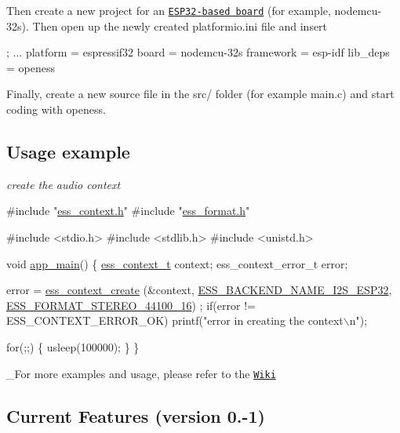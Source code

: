Then create a new project for an \href{http://docs.platformio.org/en/latest/platforms/espressif32.html#boards}{\tt E\+S\+P32-\/based board} (for example, {\ttfamily nodemcu-\/32s}). Then open up the newly created {\ttfamily platformio.\+ini} file and insert


\begin{DoxyCode}
; ...
platform = espressif32
board = nodemcu-32s
framework = esp-idf
lib\_deps = openess
\end{DoxyCode}
 Finally, create a new source file in the {\ttfamily src/} folder (for example {\ttfamily main.\+c}) and start coding with openess.

\subsection*{Usage example}

{\itshape create the audio context} 
\begin{DoxyCode}
\textcolor{preprocessor}{#include "\hyperlink{ess__context_8h}{ess\_context.h}"}
\textcolor{preprocessor}{#include "\hyperlink{ess__format_8h}{ess\_format.h}"}

\textcolor{preprocessor}{#include <stdio.h>}
\textcolor{preprocessor}{#include <stdlib.h>}
\textcolor{preprocessor}{#include <unistd.h>}


\textcolor{keywordtype}{void} \hyperlink{esp32__create__context_8c_abce06be17fc37d675118a678a8100a36}{app\_main}() \{
  \hyperlink{structess__context}{ess\_context\_t} context;
  ess\_context\_error\_t error;

  error = \hyperlink{ess__context_8h_ab105a63f0da1117385f72c8d6530023c}{ess\_context\_create} (&context, 
      \hyperlink{config_8h_a02a4eb9ca75bf77fd60b4cb7bde37f2f}{ESS\_BACKEND\_NAME\_I2S\_ESP32}, \hyperlink{ess__format_8h_aa73ee1bade9564053c023e42c9ea1ec9ab4ad20e82e0980a848fb7fe80d0b3377}{ESS\_FORMAT\_STEREO\_44100\_16})
      ;
  \textcolor{keywordflow}{if}(error != ESS\_CONTEXT\_ERROR\_OK) printf(\textcolor{stringliteral}{"error in creating the context\(\backslash\)n"});

  \textcolor{keywordflow}{for}(;;) \{ usleep(100000); \}
\}
\end{DoxyCode}
 \+\_\+\+For more examples and usage, please refer to the \href{https://github.com/RoseLeBlood/openess/wiki}{\tt Wiki}

\subsection*{Current Features (version 0.-\/1)}


